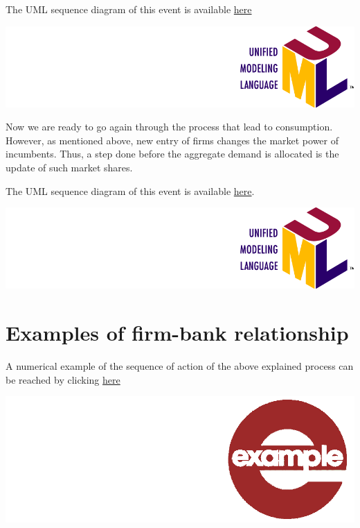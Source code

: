 \documentclass{book}
\newcommand{\doclocation}{file:///Users/giulioni/Documents/workspace/gabriele/docs}
\begin{document}
\vskip3mm
The UML sequence diagram of this event is available \href{\doclocation/umldoc/makeProduction.html}{here}
\begin{marginfigure}
	\includegraphics[scale=0.1]{uml.png}
\end{marginfigure}
\vskip3mm



Now we are ready to go again through the process that lead to consumption. However, as mentioned above, new entry of firms changes the market power of incumbents. Thus, a step done before the aggregate demand is allocated is the update of such market shares.   


\vskip3mm
The UML sequence diagram of this event is available \href{\doclocation/umldoc/setupNewFirmsToComputeProductAttractiveness.html}{here}.
\begin{marginfigure}
	\includegraphics[scale=0.1]{uml.png}
\end{marginfigure}
\vskip3mm


\section*{Examples of firm-bank relationship}

A numerical example of the sequence of action of the above explained process can be reached by clicking \href{\doclocation/umldoc/example_firm_bad_conditions.html}{here}
\begin{marginfigure}
\hskip8mm	\includegraphics[scale=0.07]{example.png}
\end{marginfigure}
\end{document}
